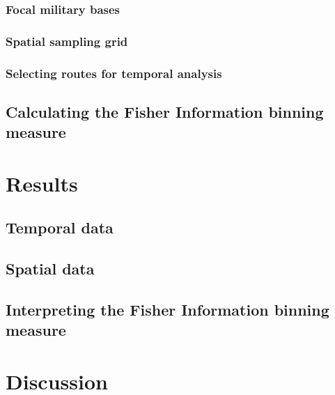 \documentclass[12pt,twoside]{reedthesis}
\begin{document}
\hypertarget{focal-military-bases}{%
\subsubsection{Focal military bases}\label{focal-military-bases}}

\hypertarget{spatial-sampling-grid}{%
\subsubsection{Spatial sampling grid}\label{spatial-sampling-grid}}

\hypertarget{selecting-routes-for-temporal-analysis}{%
\subsubsection{Selecting routes for temporal analysis}\label{selecting-routes-for-temporal-analysis}}

\hypertarget{calculating-the-fisher-information-binning-measure}{%
\subsection{Calculating the Fisher Information binning measure}\label{calculating-the-fisher-information-binning-measure}}

\hypertarget{results-1}{%
\section{Results}\label{results-1}}

\hypertarget{temporal-data}{%
\subsection{Temporal data}\label{temporal-data}}

\hypertarget{spatial-data}{%
\subsection{Spatial data}\label{spatial-data}}

\hypertarget{interpreting-the-fisher-information-binning-measure}{%
\subsection{Interpreting the Fisher Information binning measure}\label{interpreting-the-fisher-information-binning-measure}}

\hypertarget{discussion-1}{%
\section{Discussion}\label{discussion-1}}
\end{document}
